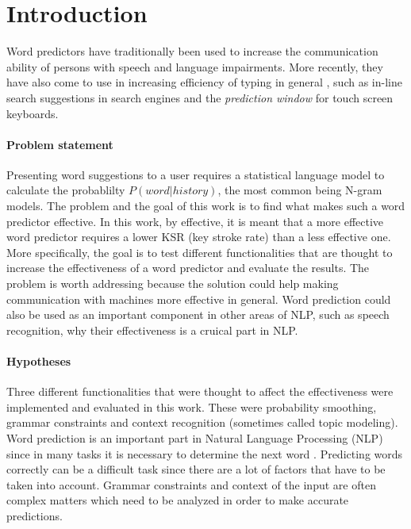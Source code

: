 \section{Introduction}
Word predictors have traditionally been used to increase the communication ability of persons with speech and language impairments\cite{Lesher99effectsof}\cite{keystrokes}\cite{corpus}. More recently, they have also come to use in increasing efficiency of typing in general \cite{Lesher99effectsof}, such as in-line search suggestions in search engines and the \emph{prediction window} for touch screen keyboards. 

\paragraph{Problem statement}
Presenting word suggestions to a user requires a statistical language model\cite{keystrokes} to calculate the probablilty $P(word|history)$, the most common being N-gram models\cite{Wandmacher}. The problem and the goal of this work is to find what makes such a word predictor effective. In this work, by effective, it is meant that a more effective word predictor requires a lower KSR (key stroke rate) than a less effective one. More specifically, the goal is to test different functionalities that are thought to increase the effectiveness of a word predictor and evaluate the results. The problem is worth addressing because the solution could help making communication with machines more effective in general. Word prediction could also be used as an important component in other areas of NLP, such as speech recognition, why their effectiveness is a cruical part in NLP.

\paragraph{Hypotheses}
Three different functionalities that were thought to affect the effectiveness were implemented and evaluated in this work. These were probability smoothing, grammar constraints and context recognition (sometimes called topic modeling).
Word prediction is an important part in Natural Language Processing (NLP) since in many tasks it is necessary to determine the next word  \cite{DBLP:journals/corr/cs-CL-0009027}.  Predicting words correctly can be a difficult task since there are a lot of factors that have to be taken into account. Grammar constraints and context of the input are often complex matters which need to be analyzed in order to make accurate predictions.
 
